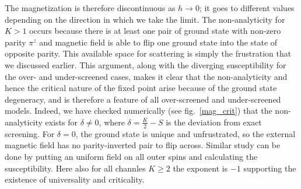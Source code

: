 \documentclass[reprint,prb,superscriptaddress]{revtex4-1}
\begin{document}
The magnetization is therefore discontinuous as \(h\to 0\); it goes to different values depending on the direction in which we take the limit. The non-analyticity for \(K>1\) occurs because there is at least one pair of ground state with non-zero parity \(\pi^z\) and magnetic field is able to flip one ground state into the state of opposite parity. This available space for scattering is simply the frustration that we discussed earlier. This argument, along with the diverging susceptibility for the over- and under-screened cases, makes it clear that {the non-analyticity and hence the critical nature of the fixed point arise because of the ground state degeneracy, and is therefore a feature of all over-screened and under-screened  models}. Indeed, we have checked numerically (see fig.~\ref{mag_crit}) that the non-analyticity exists for \(\delta \neq 0\), where \(\delta = \frac{K}{2} - S\) is the deviation from exact screening. For \(\delta=0\), the ground state is unique and unfrustrated, so the external magnetic field has no parity-inverted pair to flip across. Similar study can be done by putting an uniform field on all outer spins and calculating the susceptibility. Here also for all channles $K\geq 2$ the exponent is $-1$ supporting the existence of universality and criticality.

\end{document}
